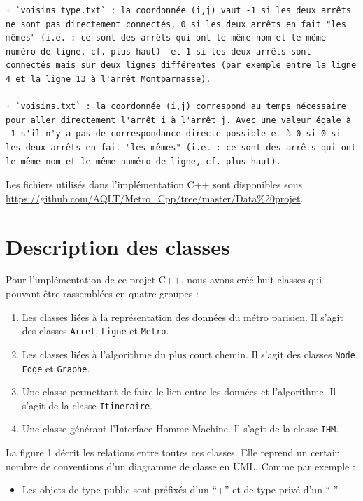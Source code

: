 \documentclass[,french]{article}
\providecommand{\tightlist}{%
  \setlength{\itemsep}{0pt}\setlength{\parskip}{0pt}}
\begin{document}
\begin{verbatim}
+ `voisins_type.txt` : la coordonnée (i,j) vaut -1 si les deux arrêts ne sont pas directement connectés, 0 si les deux arrêts en fait "les mêmes" (i.e. : ce sont des arrêts qui ont le même nom et le même numéro de ligne, cf. plus haut)  et 1 si les deux arrêts sont connectés mais sur deux lignes différentes (par exemple entre la ligne 4 et la ligne 13 à l'arrêt Montparnasse).

+ `voisins.txt` : la coordonnée (i,j) correspond au temps nécessaire pour aller directement l'arrêt i à l'arrêt j. Avec une valeur égale à -1 s'il n'y a pas de correspondance directe possible et à 0 si 0 si les deux arrêts en fait "les mêmes" (i.e. : ce sont des arrêts qui ont le même nom et le même numéro de ligne, cf. plus haut).
\end{verbatim}

Les fichiers utilisés dans l'implémentation C++ sont disponibles sous
\url{https://github.com/AQLT/Metro_Cpp/tree/master/Data\%20projet}.

\hypertarget{sec:desc_classes}{%
\section{Description des classes}\label{sec:desc_classes}}

Pour l'implémentation de ce projet C++, nous avons créé huit classes qui
pouvant être rassemblées en quatre groupes :

\begin{enumerate}
\def\labelenumi{\arabic{enumi}.}
\item
  Les classes liées à la représentation des données du métro parisien.
  Il s'agit des classes \texttt{Arret}, \texttt{Ligne} et
  \texttt{Metro}.
\item
  Les classes liées à l'algorithme du plus court chemin. Il s'agit des
  classes \texttt{Node}, \texttt{Edge} et \texttt{Graphe}.
\item
  Une classe permettant de faire le lien entre les données et
  l'algorithme. Il s'agit de la classe \texttt{Itineraire}.
\item
  Une classe générant l'Interface Homme-Machine. Il s'agit de la classe
  \texttt{IHM}.
\end{enumerate}

La figure 1 décrit les relations entre toutes ces classes. Elle reprend
un certain nombre de conventions d'un diagramme de classe en UML. Comme
par exemple :

\begin{itemize}
\tightlist
\item
  Les objets de type public sont préfixés d'un ``+'' et de type privé
  d'un ``-''
\end{itemize}
\end{document}
